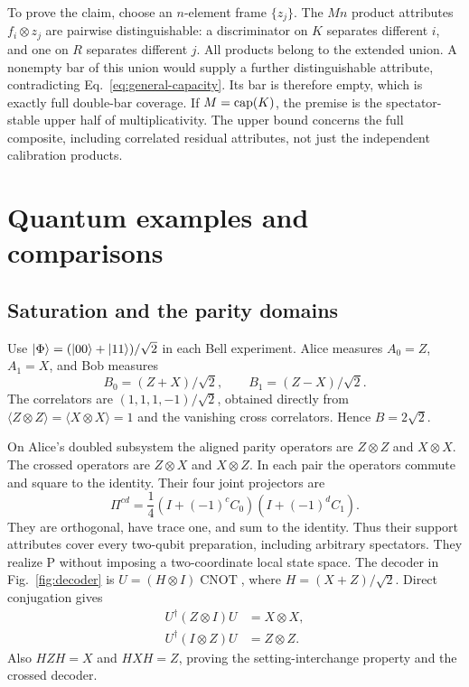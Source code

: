 To prove the claim, choose an $n$-element frame $\{z_j\}$. The $Mn$ product attributes $f_i\otimes z_j$ are pairwise distinguishable: a discriminator on $K$ separates different $i$, and one on $R$ separates different $j$. All products belong to the extended union. A nonempty bar of this union would supply a further distinguishable attribute, contradicting Eq.~\eqref{eq:general-capacity}. Its bar is therefore empty, which is exactly full double-bar coverage. If $M=\operatorname{cap}(K)$, the premise is the spectator-stable upper half of multiplicativity. The upper bound concerns the full composite, including correlated residual attributes, not just the independent calibration products.

\section{Quantum examples and comparisons}\label{app:quantum}
\subsection{Saturation and the parity domains}
Use $\lvert \Phi\rangle=(\lvert 00\rangle+\lvert 11\rangle)/\sqrt2$ in each Bell experiment. Alice measures $A_0=Z$, $A_1=X$, and Bob measures
\begin{equation}\label{eq:bob-observables}
 B_0=(Z+X)/\sqrt2,\qquad B_1=(Z-X)/\sqrt2.
\end{equation}
The correlators are $(1,1,1,-1)/\sqrt2$, obtained directly from $\langle Z\otimes Z\rangle=\langle X\otimes X\rangle=1$ and the vanishing cross correlators. Hence $B=2\sqrt2$.

On Alice's doubled subsystem the aligned parity operators are $Z\otimes Z$ and $X\otimes X$. The crossed operators are $Z\otimes X$ and $X\otimes Z$. In each pair the operators commute and square to the identity. Their four joint projectors are
\begin{equation}\label{eq:joint-projectors}
 \Pi^{cd}=\frac14(I+(-1)^cC_0)(I+(-1)^dC_1).
\end{equation}
They are orthogonal, have trace one, and sum to the identity. Thus their support attributes cover every two-qubit preparation, including arbitrary spectators. They realize P without imposing a two-coordinate local state space. The decoder in Fig.~\ref{fig:decoder} is $U=(H\otimes I)\operatorname{CNOT}$, where $H=(X+Z)/\sqrt2$. Direct conjugation gives
\begin{equation}\label{eq:decoder}
\begin{aligned}
 U^\dagger(Z\otimes I)U&=X\otimes X,\\
 U^\dagger(I\otimes Z)U&=Z\otimes Z.
\end{aligned}
\end{equation}
Also $HZH=X$ and $HXH=Z$, proving the setting-interchange property and the crossed decoder.

